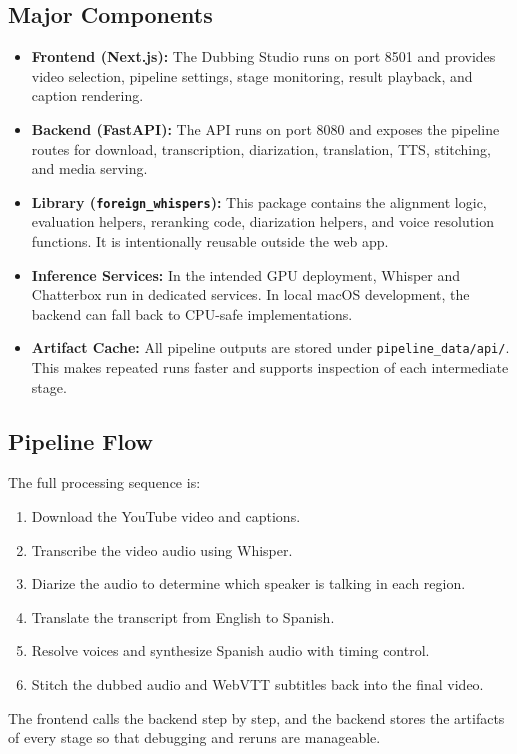 \documentclass[11pt]{article}
\begin{document}
\subsection{Major Components}
\begin{itemize}[leftmargin=*]
\item \textbf{Frontend (Next.js):} The Dubbing Studio runs on port 8501 and
provides video selection, pipeline settings, stage monitoring, result playback,
and caption rendering.
\item \textbf{Backend (FastAPI):} The API runs on port 8080 and exposes the
pipeline routes for download, transcription, diarization, translation, TTS,
stitching, and media serving.
\item \textbf{Library (\texttt{foreign\_whispers}):} This package contains the
alignment logic, evaluation helpers, reranking code, diarization helpers, and
voice resolution functions. It is intentionally reusable outside the web app.
\item \textbf{Inference Services:} In the intended GPU deployment, Whisper and
Chatterbox run in dedicated services. In local macOS development, the backend
can fall back to CPU-safe implementations.
\item \textbf{Artifact Cache:} All pipeline outputs are stored under
\texttt{pipeline\_data/api/}. This makes repeated runs faster and supports
inspection of each intermediate stage.
\end{itemize}

\subsection{Pipeline Flow}
The full processing sequence is:
\begin{enumerate}[leftmargin=*]
\item Download the YouTube video and captions.
\item Transcribe the video audio using Whisper.
\item Diarize the audio to determine which speaker is talking in each region.
\item Translate the transcript from English to Spanish.
\item Resolve voices and synthesize Spanish audio with timing control.
\item Stitch the dubbed audio and WebVTT subtitles back into the final video.
\end{enumerate}

The frontend calls the backend step by step, and the backend stores the
artifacts of every stage so that debugging and reruns are manageable.
\end{document}
